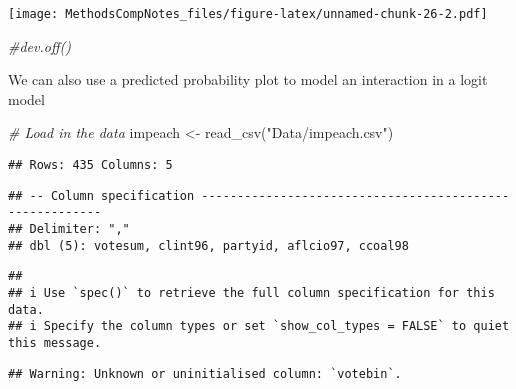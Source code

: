\documentclass[
]{article}
\newenvironment{Shaded}{\begin{snugshade}}{\end{snugshade}}
\newcommand{\CommentTok}[1]{\textcolor[rgb]{0.56,0.35,0.01}{\textit{#1}}}
\newcommand{\DecValTok}[1]{\textcolor[rgb]{0.00,0.00,0.81}{#1}}
\newcommand{\FunctionTok}[1]{\textcolor[rgb]{0.00,0.00,0.00}{#1}}
\newcommand{\NormalTok}[1]{#1}
\newcommand{\OtherTok}[1]{\textcolor[rgb]{0.56,0.35,0.01}{#1}}
\newcommand{\SpecialCharTok}[1]{\textcolor[rgb]{0.00,0.00,0.00}{#1}}
\newcommand{\StringTok}[1]{\textcolor[rgb]{0.31,0.60,0.02}{#1}}
\begin{document}
\texttt{[image: MethodsCompNotes\_files/figure-latex/unnamed-chunk-26-2.pdf]}

\begin{Shaded}
\begin{Highlighting}[]
\CommentTok{\#dev.off()}
\end{Highlighting}
\end{Shaded}

We can also use a predicted probability plot to model an interaction in
a logit model

\begin{Shaded}
\begin{Highlighting}[]
\CommentTok{\# Load in the data}
\NormalTok{impeach }\OtherTok{\textless{}{-}} \FunctionTok{read\_csv}\NormalTok{(}\StringTok{"Data/impeach.csv"}\NormalTok{)}
\end{Highlighting}
\end{Shaded}

\begin{verbatim}
## Rows: 435 Columns: 5
\end{verbatim}

\begin{verbatim}
## -- Column specification --------------------------------------------------------
## Delimiter: ","
## dbl (5): votesum, clint96, partyid, aflcio97, ccoal98
\end{verbatim}

\begin{verbatim}
## 
## i Use `spec()` to retrieve the full column specification for this data.
## i Specify the column types or set `show_col_types = FALSE` to quiet this message.
\end{verbatim}

\begin{Shaded}
\end{Shaded}

\begin{verbatim}
## Warning: Unknown or uninitialised column: `votebin`.
\end{verbatim}
\end{document}
